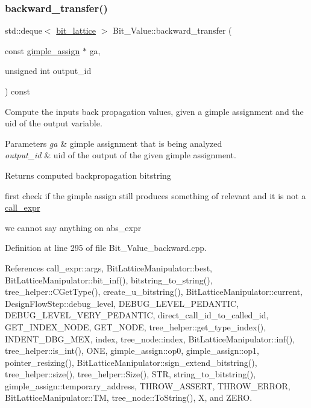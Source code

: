 \subsubsection{\texorpdfstring{backward\+\_\+transfer()}{backward\_transfer()}}
{\footnotesize\ttfamily std\+::deque$<$ \hyperlink{bit__lattice_8hpp_ab732360111c810c4eaeb4c8b81d160d6}{bit\+\_\+lattice} $>$ Bit\+\_\+\+Value\+::backward\+\_\+transfer (\begin{DoxyParamCaption}\item[{const \hyperlink{structgimple__assign}{gimple\+\_\+assign} $\ast$}]{ga,  }\item[{unsigned int}]{output\+\_\+id }\end{DoxyParamCaption}) const\hspace{0.3cm}{\ttfamily [private]}}



Compute the inputs back propagation values, given a gimple assignment and the uid of the output variable. 


\begin{DoxyParams}{Parameters}
{\em ga} & gimple assignment that is being analyzed \\
\hline
{\em output\+\_\+id} & uid of the output of the given gimple assignment. \\
\hline
\end{DoxyParams}
\begin{DoxyReturn}{Returns}
computed backpropagation bitstring 
\end{DoxyReturn}
first check if the gimple assign still produces something of relevant and it is not a \hyperlink{structcall__expr}{call\+\_\+expr}

we cannot say anything on abs\+\_\+expr 

Definition at line 295 of file Bit\+\_\+\+Value\+\_\+backward.\+cpp.



References call\+\_\+expr\+::args, Bit\+Lattice\+Manipulator\+::best, Bit\+Lattice\+Manipulator\+::bit\+\_\+inf(), bitstring\+\_\+to\+\_\+string(), tree\+\_\+helper\+::\+C\+Get\+Type(), create\+\_\+u\+\_\+bitstring(), Bit\+Lattice\+Manipulator\+::current, Design\+Flow\+Step\+::debug\+\_\+level, D\+E\+B\+U\+G\+\_\+\+L\+E\+V\+E\+L\+\_\+\+P\+E\+D\+A\+N\+T\+IC, D\+E\+B\+U\+G\+\_\+\+L\+E\+V\+E\+L\+\_\+\+V\+E\+R\+Y\+\_\+\+P\+E\+D\+A\+N\+T\+IC, direct\+\_\+call\+\_\+id\+\_\+to\+\_\+called\+\_\+id, G\+E\+T\+\_\+\+I\+N\+D\+E\+X\+\_\+\+N\+O\+DE, G\+E\+T\+\_\+\+N\+O\+DE, tree\+\_\+helper\+::get\+\_\+type\+\_\+index(), I\+N\+D\+E\+N\+T\+\_\+\+D\+B\+G\+\_\+\+M\+EX, index, tree\+\_\+node\+::index, Bit\+Lattice\+Manipulator\+::inf(), tree\+\_\+helper\+::is\+\_\+int(), O\+NE, gimple\+\_\+assign\+::op0, gimple\+\_\+assign\+::op1, pointer\+\_\+resizing(), Bit\+Lattice\+Manipulator\+::sign\+\_\+extend\+\_\+bitstring(), tree\+\_\+helper\+::size(), tree\+\_\+helper\+::\+Size(), S\+TR, string\+\_\+to\+\_\+bitstring(), gimple\+\_\+assign\+::temporary\+\_\+address, T\+H\+R\+O\+W\+\_\+\+A\+S\+S\+E\+RT, T\+H\+R\+O\+W\+\_\+\+E\+R\+R\+OR, Bit\+Lattice\+Manipulator\+::\+TM, tree\+\_\+node\+::\+To\+String(), X, and Z\+E\+RO.



